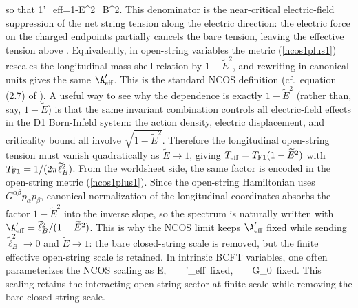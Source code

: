 \documentclass[12pt]{article}
\newcommand{\wt}[1]{\widetilde{#1}}
\begin{document}
\fe
so that
\ie
{1\pi\A'_{\rm eff}}={1-\widetilde E^2\pi\wt\ell_B^2}.
\fe
This denominator is the near-critical electric-field suppression of the net string tension along the electric direction: the electric force on the charged endpoints partially cancels the bare tension, leaving the effective tension above \cite{seiberg2000stringsbackgroundelectricfield}. Equivalently, in open-string variables the metric (\ref{ncos1plus1}) rescales the longitudinal mass-shell relation by $1-\widetilde E^2$, and rewriting in canonical units gives the same $\A'_{\rm eff}$. This is the standard NCOS definition (cf.\ equation (2.7) of \cite{seiberg2000stringsbackgroundelectricfield}).
A useful way to see why the dependence is exactly $1-\widetilde E^2$ (rather than, say, $1-\widetilde E$) is that the same invariant combination controls all electric-field effects in the D1 Born-Infeld system: the action density, electric displacement, and criticality bound all involve $\sqrt{1-\widetilde E^2}$. Therefore the longitudinal open-string tension must vanish quadratically as $\widetilde E\to 1$, giving $T_{\rm eff}=T_{\rm F1}(1-\widetilde E^2)$ with $T_{\rm F1}=1/(2\pi\wt\ell_B^2)$.
From the worldsheet side, the same factor is encoded in the open-string metric (\ref{ncos1plus1}). Since the open-string Hamiltonian uses $G^{\alpha\beta}p_\alpha p_\beta$, canonical normalization of the longitudinal coordinates absorbs the factor $1-\widetilde E^2$ into the inverse slope, so the spectrum is naturally written with $\A'_{\rm eff}=\wt\ell_B^2/(1-\widetilde E^2)$. This is why the NCOS limit keeps $\A'_{\rm eff}$ fixed while sending $\wt\ell_B^2\to 0$ and $\widetilde E\to 1$: the bare closed-string scale is removed, but the finite effective open-string scale is retained.
In intrinsic BCFT variables, one often parameterizes the NCOS scaling as
\ie\label{ncoslimit}
\widetilde E,~~~~\A'_{\rm eff}~{\rm fixed},~~~~G_0~{\rm fixed}.
\fe
This scaling retains the interacting open-string sector at finite scale while removing the bare closed-string scale.
\end{document}
